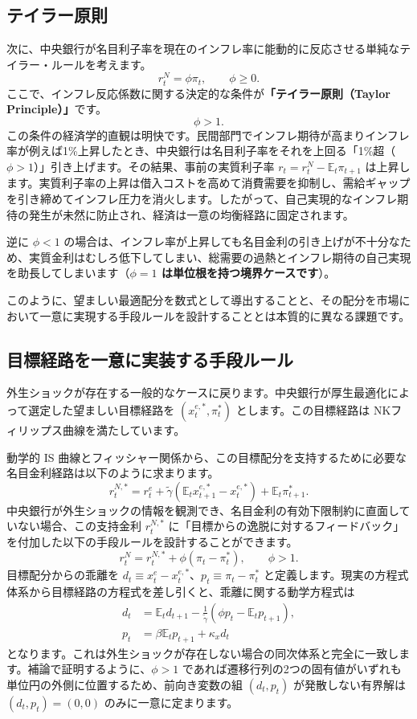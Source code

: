 \documentclass[
  japanese,
  lualatex,
  ja=standard,
  12pt,
  a4paper]{ltjsarticle}
\begin{document}
\subsection{テイラー原則}\label{ux30c6ux30a4ux30e9ux30fcux539fux5247}

次に、中央銀行が名目利子率を現在のインフレ率に能動的に反応させる単純なテイラー・ルールを考えます。
\[
r_t^N=\phi\pi_t,
\qquad
\phi\geq0.
\]
ここで、インフレ反応係数に関する決定的な条件が\textbf{「テイラー原則（Taylor
Principle）」}です。 \[
\phi>1.
\]
この条件の経済学的直観は明快です。民間部門でインフレ期待が高まりインフレ率が例えば1\%上昇したとき、中央銀行は名目利子率をそれを上回る「1\%超（\textbf{\(\phi>1\)}）」引き上げます。その結果、事前の実質利子率
\(r_t = r_t^N - \mathbb{E}_t\pi_{t+1}\)
は上昇します。実質利子率の上昇は借入コストを高めて消費需要を抑制し、需給ギャップを引き締めてインフレ圧力を消火します。したがって、自己実現的なインフレ期待の発生が未然に防止され、経済は一意の均衡経路に固定されます。

逆に \(\phi<1\)
の場合は、インフレ率が上昇しても名目金利の引き上げが不十分なため、実質金利はむしろ低下してしまい、総需要の過熱とインフレ期待の自己実現を助長してしまいます（\textbf{\(\phi=1\)
は単位根を持つ境界ケースです}）。

このように、望ましい最適配分を数式として導出することと、その配分を市場において一意に実現する手段ルールを設計することとは本質的に異なる課題です。

\subsection{目標経路を一意に実装する手段ルール}\label{sec-lecture09-implementation}

外生ショックが存在する一般的なケースに戻ります。中央銀行が厚生最適化によって選定した望ましい目標経路を
\((x_t^{e,*}, \pi_t^*)\) とします。この目標経路は
NKフィリップス曲線を満たしています。

動学的 IS
曲線とフィッシャー関係から、この目標配分を支持するために必要な名目金利経路は以下のように求まります。
\[
r_t^{N,*}
=r_t^e
+\tilde{\gamma}\left(\mathbb{E}_t x_{t+1}^{e,*}-x_t^{e,*}\right)
+\mathbb{E}_t\pi_{t+1}^*.
\]
中央銀行が外生ショックの情報を観測でき、名目金利の有効下限制約に直面していない場合、この支持金利
\(r_t^{N,*}\)
に「目標からの逸脱に対するフィードバック」を付加した以下の手段ルールを設計することができます。
\[
r_t^N=r_t^{N,*}+\phi(\pi_t-\pi_t^*),
\qquad \phi>1.
\] 目標配分からの乖離を
\(d_t \equiv x_t^e - x_t^{e,*}\)、\(p_t \equiv \pi_t - \pi_t^*\)
と定義します。現実の方程式体系から目標経路の方程式を差し引くと、乖離に関する動学方程式は
\[
\begin{aligned}
d_t&=\mathbb{E}_t d_{t+1}
-\frac{1}{\tilde{\gamma}}\left(\phi p_t-\mathbb{E}_t p_{t+1}\right),\\
p_t&=\beta\mathbb{E}_t p_{t+1}+\kappa_x d_t
\end{aligned}
\]
となります。これは外生ショックが存在しない場合の同次体系と完全に一致します。補論で証明するように、\(\phi>1\)
であれば遷移行列の2つの固有値がいずれも単位円の外側に位置するため、前向き変数の組
\((d_t, p_t)\) が発散しない有界解は \((d_t, p_t) = (0, 0)\)
のみに一意に定まります。
\end{document}
